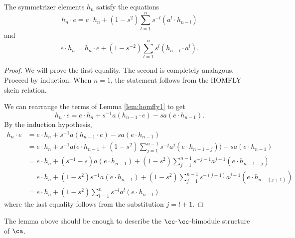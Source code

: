 \begin{proposition} \label{prop:homfly2}
The symmetrizer elements $h_n$ satisfy the equations
\[
h_n \cdot e = e \cdot h_n + ( 1 - s^2 ) \sum_{l=1}^{n} s^{-l} ( a^l \cdot h_{n-l} )
\]
and
\[
e \cdot h_n = h_n \cdot e + (1 - s^{-2} ) \sum_{l=1}^{n} s^l ( h_{n-l} \cdot a^l ).
\]
\end{proposition}
\begin{proof}
We will prove the first equality. The second is completely analagous. Proceed by induction. When $n=1$, the statement follows from the HOMFLY skein relation. 

We can rearrange the terms of Lemma \ref{lem:homfly1} to get
\begin{equation} \label{eq:homfly1b}
h_n \cdot e = e \cdot h_n + s^{-1} a ( h_{n-1} \cdot e ) - s a ( e \cdot h_{n-1} ).
\end{equation}
By the induction hypothesis,
\begin{align*}
h_n \cdot e & = e \cdot h_n + s^{-1} a ( h_{n-1} \cdot e ) - s a ( e \cdot h_{n-1} ) \\
& = e \cdot h_n + s^{-1} a \Big( e \cdot h_{n-1} + ( 1 - s^2 ) \sum_{j=1}^{n-1} s^{-j} a^j ( e \cdot h_{n-1-j} ) \Big) - s a ( e \cdot h_{n-1} ) \\
& = e \cdot h_n + ( s^{-1} - s ) a ( e \cdot h_{n-1} ) + ( 1 - s^2 ) \sum_{j=1}^{n-1} s^{-j-1} a^{j+1} ( e \cdot h_{n-1-j} ) \\ 
& = e \cdot h_n + ( 1 - s^2 ) s^{-1} a ( e \cdot h_{n-1} ) + ( 1 - s^2 ) \sum_{j=1}^{n-1} s^{-(j+1)} a^{j+1} ( e \cdot h_{n-(j+1)} ) \\
&= e \cdot h_n + ( 1 - s^2 ) \sum_{l=1}^{n} s^{-l} a^{l} ( e \cdot h_{n-l} )
\end{align*}
where the last equality follows from the substitution $j=l+1$. 
\end{proof}

\begin{remark}
The lemma above should be enough to describe the $\cc$-$\cc$-bimodule structure of $\ca$. 
\end{remark}

